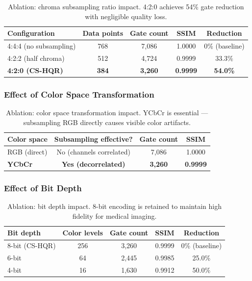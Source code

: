\documentclass{ipol}
\newcommand{\cshqr}{\textsc{CS-HQR}}
\begin{document}
\begin{table}[H]
\begin{center}
\begin{tabular}{lcccc}
\hline
Configuration & Data points & Gate count & SSIM & Reduction \\
\hline
4:4:4 (no subsampling) & 768 & 7,086 & 1.0000 & 0\% (baseline) \\
4:2:2 (half chroma) & 512 & 4,724 & 0.9999 & 33.3\% \\
\rowcolor{green!15}
\textbf{4:2:0 (\cshqr)} & \textbf{384} & \textbf{3,260} & \textbf{0.9999} & \textbf{54.0\%} \\
\hline
\end{tabular}
\caption{Ablation: chroma subsampling ratio impact. 4:2:0 achieves 54\%
  gate reduction with negligible quality loss.}
\label{tab:ablation_subsampling}
\end{center}
\end{table}

\FloatBarrier
\subsubsection{Effect of Color Space Transformation}

\begin{table}[H]
\begin{center}
\begin{tabular}{lccc}
\hline
Color space & Subsampling effective? & Gate count & SSIM \\
\hline
RGB (direct) & No (channels correlated) & 7,086 & 1.0000 \\
\rowcolor{green!15}
\textbf{YCbCr} & \textbf{Yes (decorrelated)} & \textbf{3,260} & \textbf{0.9999} \\
\hline
\end{tabular}
\caption{Ablation: color space transformation impact. YCbCr is essential ---
  subsampling RGB directly causes visible color artifacts.}
\label{tab:ablation_colorspace}
\end{center}
\end{table}

\FloatBarrier
\subsubsection{Effect of Bit Depth}

\begin{table}[H]
\begin{center}
\begin{tabular}{lcccc}
\hline
Bit depth & Color levels & Gate count & SSIM & Reduction \\
\hline
8-bit (\cshqr) & 256 & 3,260 & 0.9999 & 0\% (baseline) \\
6-bit & 64 & 2,445 & 0.9985 & 25.0\% \\
4-bit & 16 & 1,630 & 0.9912 & 50.0\% \\
\hline
\end{tabular}
\caption{Ablation: bit depth impact. 8-bit encoding is retained to maintain
  high fidelity for medical imaging.}
\label{tab:ablation_bitdepth}
\end{center}
\end{table}
\end{document}
